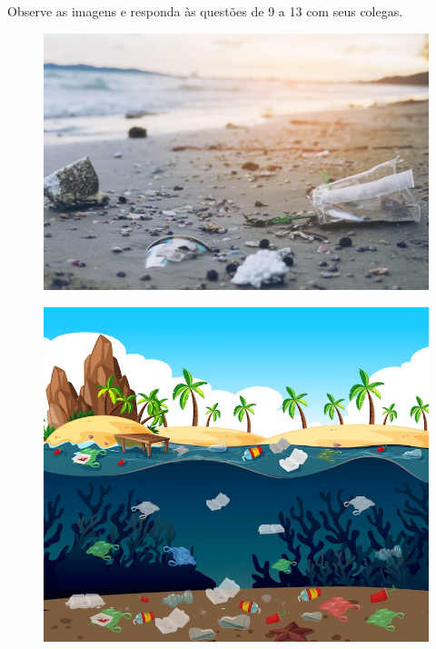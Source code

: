 Observe as imagens e responda às questões de 9 a 13 com seus colegas.

\begin{figure}[htpb!]
\includegraphics[width=\textwidth]{./imgs/img35.png}
\end{figure}


\pagebreak

\begin{figure}[htpb!]
\includegraphics[width=\textwidth]{./imgs/img36.png}
\end{figure}


